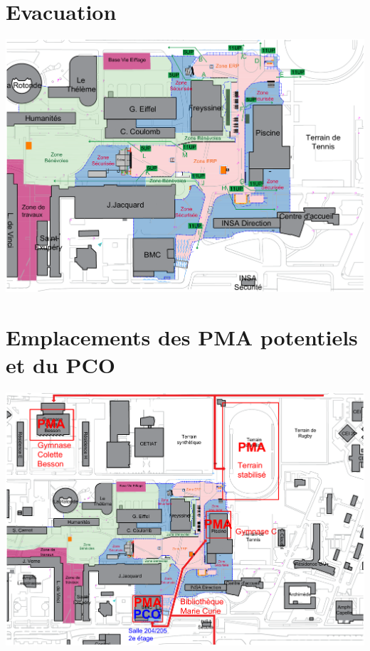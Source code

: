 \documentclass[hidelinks, paper=a4, fontsize=13pt]{report}
\begin{document}
\section{Evacuation}
	\begin{center}\includegraphics[width=.95\textheight,angle=90]{Exports/Plan_24h_45eme-IS}\end{center}


\section{Emplacements des PMA potentiels et du PCO}
	\begin{center}\includegraphics[width=.95\textheight,angle=90]{Exports/Plan_24h_45eme-PCO_PMA}\end{center}
\end{document}
